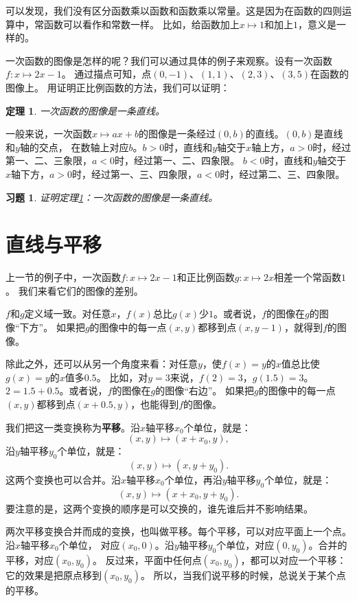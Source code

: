 \documentclass[12pt,UTF8]{ctexbook}
\newtheorem{tm}{定理}[section]
\newtheorem{xt}{习题}[section]
\begin{document}
可以发现，我们没有区分函数乘以函数和函数乘以常量。这是因为在函数的四则运算中，常函数可以看作和常数一样。
比如，给函数加上$x\mapsto 1$和加上$1$，意义是一样的。

一次函数的图像是怎样的呢？我们可以通过具体的例子来观察。设有一次函数$f: x\mapsto 2x - 1$。
通过描点可知，点$(0, -1)$、$(1, 1)$、$(2, 3)$、$(3, 5)$在函数的图像上。
用证明正比例函数的方法，我们可以证明：

\begin{tm}\label{tm:5-1-0}
    一次函数的图像是一条直线。
\end{tm}

一般来说，一次函数$x\mapsto ax + b$的图像是一条经过$(0, b)$的直线。$(0, b)$是直线和$y$轴的交点，
在数轴上对应$b$。$b>0$时，直线和$y$轴交于$x$轴上方，$a>0$时，经过第一、二、三象限，$a<0$时，经过第一、二、四象限。
$b<0$时，直线和$y$轴交于$x$轴下方，$a>0$时，经过第一、三、四象限，$a<0$时，经过第二、三、四象限。

\begin{xt}
    证明定理\ref{tm:5-1-0}：一次函数的图像是一条直线。
\end{xt}

\section{直线与平移}
上一节的例子中，一次函数$f: x\mapsto 2x - 1$和正比例函数$g: x\mapsto 2x$相差一个常函数$1$。
我们来看它们的图像的差别。

$f$和$g$定义域一致。对任意$x$，$f(x)$总比$g(x)$少$1$。或者说，$f$的图像在$g$的图像“下方”。
如果把$g$的图像中的每一点$(x, y)$都移到点$(x, y-1)$，就得到$f$的图像。

除此之外，还可以从另一个角度来看：对任意$y$，使$f(x)=y$的$x$值总比使$g(x)=y$的$x$值多$0.5$。
比如，对$y=3$来说，$f(2)=3$，$g(1.5)=3$。$2=1.5+0.5$。或者说，$f$的图像在$g$的图像“右边”。
如果把$g$的图像中的每一点$(x, y)$都移到点$(x+0.5, y)$，也能得到$f$的图像。

我们把这一类变换称为\textbf{平移}。沿$x$轴平移$x_0$个单位，就是：
$$ (x, y) \mapsto (x+x_0, y),$$
沿$y$轴平移$y_0$个单位，就是：
$$ (x, y) \mapsto (x, y+y_0).$$
这两个变换也可以合并。沿$x$轴平移$x_0$个单位，再沿$y$轴平移$y_0$个单位，就是：
$$ (x, y) \mapsto (x+x_0, y+y_0).$$
要注意的是，这两个变换的顺序是可以交换的，谁先谁后并不影响结果。

两次平移变换合并而成的变换，也叫做平移。每个平移，可以对应平面上一个点。沿$x$轴平移$x_0$个单位，
对应$(x_0, 0)$。沿$y$轴平移$y_0$个单位，对应$(0, y_0)$。合并的平移，对应$(x_0, y_0)$。
反过来，平面中任何点$(x_0, y_0)$，都可以对应一个平移：它的效果是把原点移到$(x_0, y_0)$。
所以，当我们说平移的时候，总说关于某个点的平移。
\end{document}
